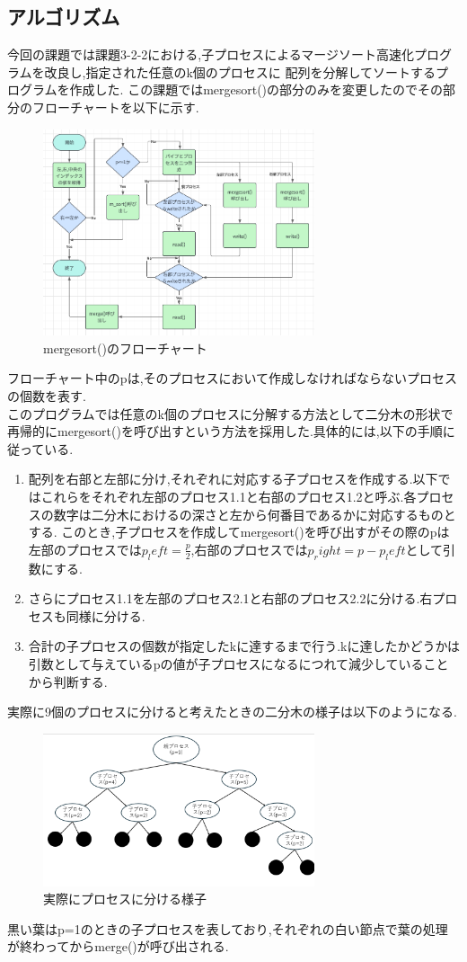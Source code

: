 \documentclass[dvipdfmx]{jarticle}
\begin{document}
\subsection{アルゴリズム}
今回の課題では課題3-2-2における,子プロセスによるマージソート高速化プログラムを改良し,指定された任意のk個のプロセスに
配列を分解してソートするプログラムを作成した.
この課題ではmergesort()の部分のみを変更したのでその部分のフローチャートを以下に示す.
\begin{figure}[h]
    \centering
    \includegraphics[width=8cm]{hatten2hurotya.png}
    \caption{mergesort()のフローチャート}
\end{figure}
フローチャート中のpは,そのプロセスにおいて作成しなければならないプロセスの個数を表す.\\
このプログラムでは任意のk個のプロセスに分解する方法として二分木の形状で再帰的にmergesort()を呼び出すという方法を採用した.具体的には,以下の手順に従っている.
\begin{enumerate}
    \item 配列を右部と左部に分け,それぞれに対応する子プロセスを作成する.以下ではこれらをそれぞれ左部のプロセス1.1と右部のプロセス1.2と呼ぶ.各プロセスの数字は二分木におけるの深さと左から何番目であるかに対応するものとする.
    このとき,子プロセスを作成してmergesort()を呼び出すがその際のpは左部のプロセスでは$p_left=\frac{p}{2}$,右部のプロセスでは$p_right=p-p_left$として引数にする.
    \item さらにプロセス1.1を左部のプロセス2.1と右部のプロセス2.2に分ける.右プロセスも同様に分ける.
    \item 合計の子プロセスの個数が指定したkに達するまで行う.kに達したかどうかは引数として与えているpの値が子プロセスになるにつれて減少していることから判断する.
\end{enumerate}
実際に9個のプロセスに分けると考えたときの二分木の様子は以下のようになる.
\begin{figure}[h]
    \centering
    \includegraphics[width=8cm]{hatten2tree.png}
    \caption{実際にプロセスに分ける様子}
\end{figure}
黒い葉はp=1のときの子プロセスを表しており,それぞれの白い節点で葉の処理が終わってからmerge()が呼び出される.
\end{document}
